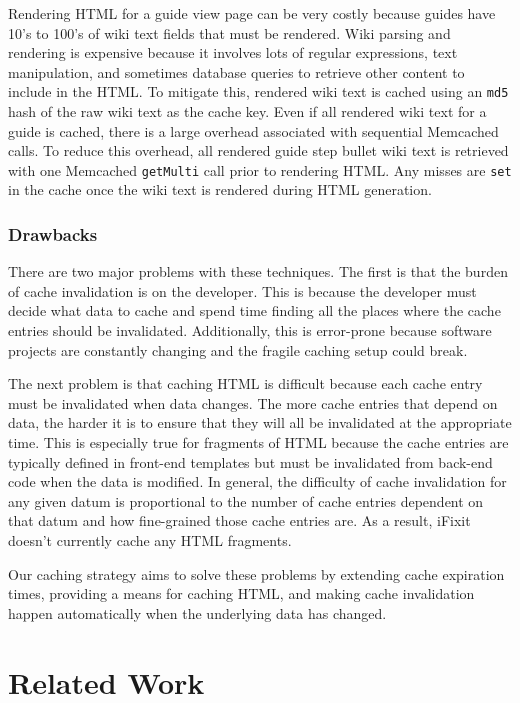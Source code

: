 \documentclass[12pt]{ucthesis}
\begin{document}
Rendering HTML for a guide view page can be very costly because guides have 10's to 100's of wiki text fields that must be rendered.
Wiki parsing and rendering is expensive because it involves lots of regular expressions, text manipulation, and sometimes database queries to retrieve other content to include in the HTML\@.
To mitigate this, rendered wiki text is cached using an {\tt md5} hash of the raw wiki text as the cache key.
Even if all rendered wiki text for a guide is cached, there is a large overhead associated with sequential \textsf{Memcached} calls.
To reduce this overhead, all rendered guide step bullet wiki text is retrieved with one \textsf{Memcached} {\tt getMulti} call prior to rendering HTML\@.
Any misses are {\tt set} in the cache once the wiki text is rendered during HTML generation.

\subsubsection{Drawbacks}
There are two major problems with these techniques.
The first is that the burden of cache invalidation is on the developer.
This is because the developer must decide what data to cache and spend time finding all the places where the cache entries should be invalidated.
Additionally, this is error-prone because software projects are constantly changing and the fragile caching setup could break.

The next problem is that caching HTML is difficult because each cache entry must be invalidated when data changes.
The more cache entries that depend on data, the harder it is to ensure that they will all be invalidated at the appropriate time.
This is especially true for fragments of HTML because the cache entries are typically defined in front-end templates but must be invalidated from back-end code when the data is modified.
In general, the difficulty of cache invalidation for any given datum is proportional to the number of cache entries dependent on that datum and how fine-grained those cache entries are.
As a result, \textsf{iFixit} doesn't currently cache any HTML fragments.

Our caching strategy aims to solve these problems by extending cache expiration times, providing a means for caching HTML, and making cache invalidation happen automatically when the underlying data has changed.

\section{Related Work}
\end{document}

